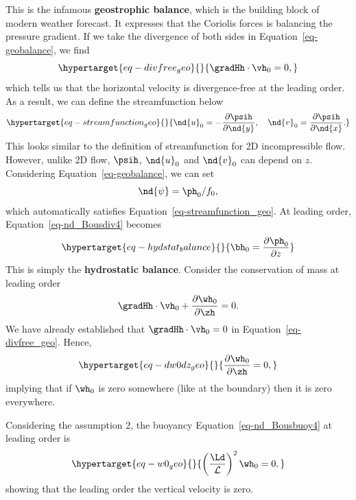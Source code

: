 \documentclass[
  letterpaper,
  twocolumn,
  landscape]{report}
\begin{document}
This is the infamous \textbf{geostrophic balance}, which is the building
block of modern weather forecast. It expresses that the Coriolis forces
is balancing the pressure gradient. If we take the divergence of both
sides in Equation~\ref{eq-geobalance}, we find
\begin{equation}\protect\hypertarget{eq-divfree_geo}{}{  \gradHh \cdot\vh_0 = 0, }\label{eq-divfree_geo}\end{equation}
which tells us that the horizontal velocity is divergence-free at the
leading order. As a result, we can define the streamfunction below
\begin{equation}\protect\hypertarget{eq-streamfunction_geo}{}{ \nd{u}_0 = - \frac{\partial \psih}{\partial \nd{y}}, \quad \nd{v}_0 = \frac{\partial \psih}{\partial \nd{x}}. }\label{eq-streamfunction_geo}\end{equation}
This looks similar to the definition of streamfunction for 2D
incompressible flow. However, unlike 2D flow, \(\psih\), \(\nd{u}_0\)
and \(\nd{v}_0\) can depend on \(z\). Considering
Equation~\ref{eq-geobalance}, we can set \[
    \nd{\psi} = \ph_0/f_0,
\] which automatically satisfies Equation~\ref{eq-streamfunction_geo}.
At leading order, Equation~\ref{eq-nd_Bousdiv4} becomes
\begin{equation}\protect\hypertarget{eq-hydstat_balance}{}{   \bh_0 = \frac{\partial \ph_0}{\partial z} }\label{eq-hydstat_balance}\end{equation}
This is simply the \textbf{hydrostatic balance}. Consider the
conservation of mass at leading order \[
    \gradHh \cdot\vh_0 + \frac{\partial \wh_0}{\partial \zh} = 0.
\] We have already established that \(\gradHh \cdot\vh_0 = 0\) in
Equation~\ref{eq-divfree_geo}. Hence,
\begin{equation}\protect\hypertarget{eq-dw0dz_geo}{}{ \frac{\partial \wh_0}{\partial \zh} = 0, }\label{eq-dw0dz_geo}\end{equation}
implying that if \(\wh_0\) is zero somewhere (like at the boundary) then
it is zero everywhere.

Considering the assumption 2, the buoyancy
Equation~\ref{eq-nd_Bousbuoy4} at leading order is
\begin{equation}\protect\hypertarget{eq-w0_geo}{}{ \left( \frac{\Ld}{\mathcal{L}} \right)^2 \wh_0 = 0, }\label{eq-w0_geo}\end{equation}
showing that the leading order the vertical velocity is zero.
\end{document}
